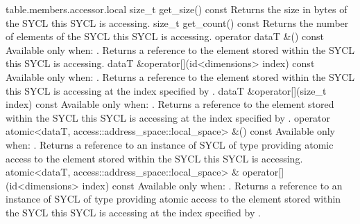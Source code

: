 {table.members.accessor.local}
  \addRow
    { size_t get_size() const }
    {
      Returns the size in bytes of the SYCL  this SYCL
       is accessing.
    }
  \addRow
    { size_t get_count() const }
    {
      Returns the number of elements of the SYCL  this SYCL  is accessing.
    }
  \addRow
    { operator dataT \&() const }
    {
      Available only when: .
      \newline
      Returns a reference to the element stored within the SYCL  this SYCL  is accessing.
    }
  \addRow
    { dataT \&operator[](id<dimensions> index) const }
    {
      Available only when: .
      \newline
      Returns a reference to the element stored within the SYCL  this SYCL  is accessing at the index
      specified by .
    }
  \addRow
    { dataT \&operator[](size_t index) const }
    {
      Available only when: .
      \newline
      Returns a reference to the element stored within the SYCL  this SYCL  is accessing at the index
      specified by .
    }
  \addRowTwoL
    { operator atomic<dataT, }
    { access::address_space::local_space> \&() const }
    {
      Available only when: .
      \newline
      Returns a reference to an instance of SYCL  of type
       providing atomic access to the element stored within
      the SYCL  this SYCL  is accessing.
    }
  \addRowTwoL
    { atomic<dataT, access::address_space::local_space> \& }
    { operator[](id<dimensions> index) const }
    {
      Available only when: .
      \newline
      Returns a reference to an instance of SYCL  of type
       providing atomic access to the element stored within
      the SYCL  this SYCL  is accessing
      at the index specified by .
    }
